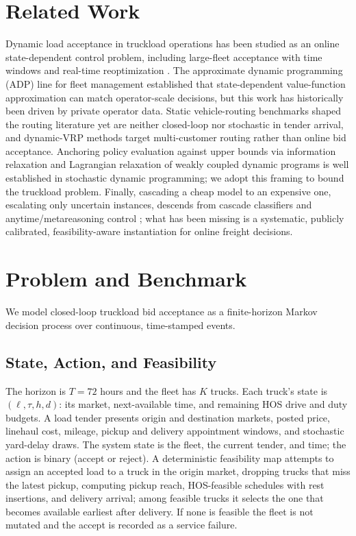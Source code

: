 \documentclass[numbered]{trbunofficial}
\begin{document}
\section{Related Work}
Dynamic load acceptance in truckload operations has been studied as an
online state-dependent control problem, including large-fleet acceptance
with time windows \citep{kim2004dynamic} and real-time reoptimization
\citep{yang2004realtime}. The approximate dynamic programming (ADP) line
for fleet management \citep{simao2009adp,powell2007stochastic} established
that state-dependent value-function approximation can match operator-scale
decisions, but this work has historically been driven by private operator
data. Static vehicle-routing benchmarks \citep{solomon1987vrptw,uchoa2017cvrp}
shaped the routing literature yet are neither closed-loop nor stochastic in
tender arrival, and dynamic-VRP methods
\citep{ulmer2019offline,pillac2013review} target multi-customer routing
rather than online bid acceptance. Anchoring policy evaluation against
upper bounds via information relaxation \citep{brown2010information} and
Lagrangian relaxation of weakly coupled dynamic programs
\citep{adelman2008relaxations,yezhu2014weakly} is well established in
stochastic dynamic programming; we adopt this framing to bound the
truckload problem. Finally, cascading a cheap model to an expensive one,
escalating only uncertain instances, descends from cascade classifiers and
anytime/metareasoning control \citep{violajones2001,zilberstein1996}; what
has been missing is a systematic, publicly calibrated, feasibility-aware
instantiation for online freight decisions.

\section{Problem and Benchmark}
We model closed-loop truckload bid acceptance as a finite-horizon Markov
decision process over continuous, time-stamped events.

\subsection{State, Action, and Feasibility}
The horizon is $T=72$ hours and the fleet has $K$ trucks. Each truck's
state is $(\ell, \tau, h, d)$: its market, next-available time, and
remaining HOS drive and duty budgets. A load tender presents origin and
destination markets, posted price, linehaul cost, mileage, pickup and
delivery appointment windows, and stochastic yard-delay draws. The system
state is the fleet, the current tender, and time; the action is binary
(accept or reject). A deterministic feasibility map attempts to assign an
accepted load to a truck in the origin market, dropping trucks that miss
the latest pickup, computing pickup reach, HOS-feasible schedules with
rest insertions, and delivery arrival; among feasible trucks it selects the
one that becomes available earliest after delivery. If none is feasible the
fleet is not mutated and the accept is recorded as a service failure.
\end{document}
